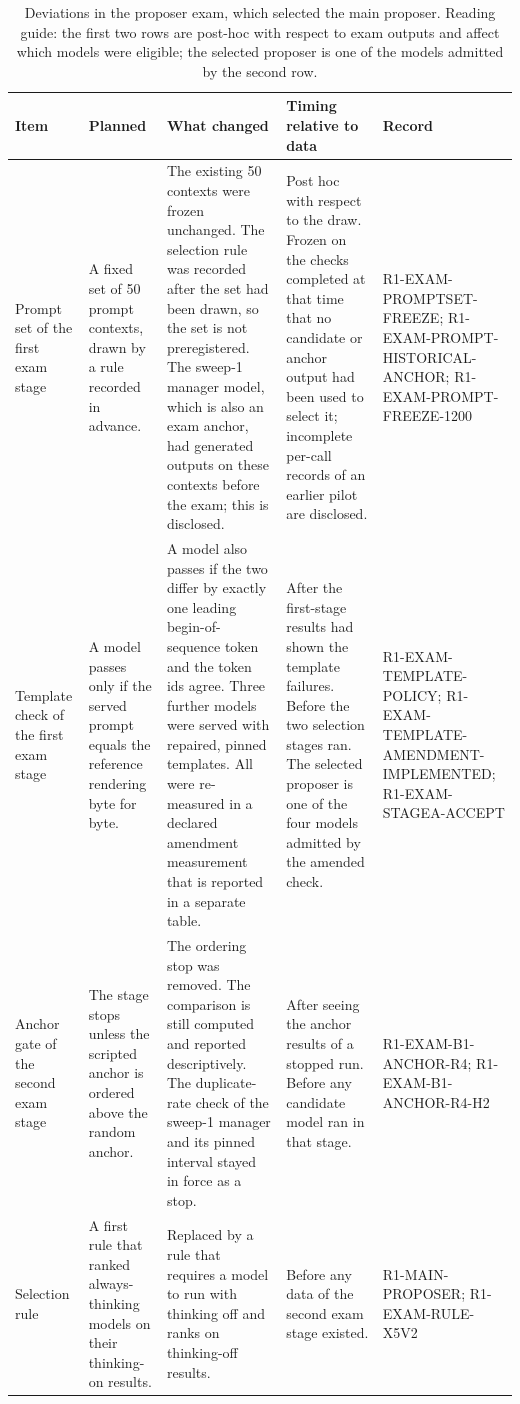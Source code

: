 \begin{table}[t]
\caption{Deviations in the proposer exam, which selected the main proposer. Reading guide: the first two rows are post-hoc with respect to exam outputs and affect which models were eligible; the selected proposer is one of the models admitted by the second row.}
\label{tab:dev-exam}
\footnotesize
\setlength{\tabcolsep}{3pt}
\begin{tabular}{L{0.8in}L{1.3in}L{1.9in}L{1.25in}L{0.98in}}
\toprule
Item & Planned & What changed & Timing relative to data & Record \\
\midrule
Prompt set of the first exam stage &
A fixed set of 50 prompt contexts, drawn by a rule recorded in advance. &
The existing 50 contexts were frozen unchanged. The selection rule was recorded after the set had been drawn, so the set is not preregistered. The sweep-1 manager model, which is also an exam anchor, had generated outputs on these contexts before the exam; this is disclosed. &
Post hoc with respect to the draw. Frozen on the checks completed at that time that no candidate or anchor output had been used to select it; incomplete per-call records of an earlier pilot are disclosed. &
R1-EXAM-PROMPTSET-FREEZE; R1-EXAM-PROMPT-HISTORICAL-ANCHOR; R1-EXAM-PROMPT-FREEZE-1200 \\
\addlinespace
Template check of the first exam stage &
A model passes only if the served prompt equals the reference rendering byte for byte. &
A model also passes if the two differ by exactly one leading begin-of-sequence token and the token ids agree. Three further models were served with repaired, pinned templates. All were re-measured in a declared amendment measurement that is reported in a separate table. &
After the first-stage results had shown the template failures. Before the two selection stages ran. The selected proposer is one of the four models admitted by the amended check. &
R1-EXAM-TEMPLATE-POLICY; R1-EXAM-TEMPLATE-AMENDMENT-IMPLEMENTED; R1-EXAM-STAGEA-ACCEPT \\
\addlinespace
Anchor gate of the second exam stage &
The stage stops unless the scripted anchor is ordered above the random anchor. &
The ordering stop was removed. The comparison is still computed and reported descriptively. The duplicate-rate check of the sweep-1 manager and its pinned interval stayed in force as a stop. &
After seeing the anchor results of a stopped run. Before any candidate model ran in that stage. &
R1-EXAM-B1-ANCHOR-R4; R1-EXAM-B1-ANCHOR-R4-H2 \\
\addlinespace
Selection rule &
A first rule that ranked always-thinking models on their thinking-on results. &
Replaced by a rule that requires a model to run with thinking off and ranks on thinking-off results. &
Before any data of the second exam stage existed. &
R1-MAIN-PROPOSER; R1-EXAM-RULE-X5V2 \\
\bottomrule
\end{tabular}
\end{table}

